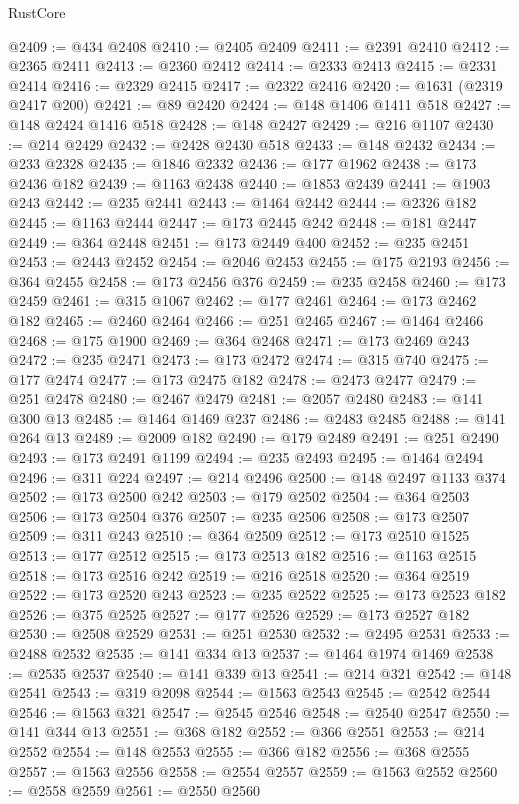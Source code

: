 \begin{lexlean}{RustCore}
\begin{coremodule}
@2409 := @434 @2408
@2410 := @2405 @2409
@2411 := @2391 @2410
@2412 := @2365 @2411
@2413 := @2360 @2412
@2414 := @2333 @2413
@2415 := @2331 @2414
@2416 := @2329 @2415
@2417 := @2322 @2416
@2420 := @1631 (@2319 @2417 @200)
@2421 := @89 @2420
@2424 := @148 @1406 @1411 @518
@2427 := @148 @2424 @1416 @518
@2428 := @148 @2427
@2429 := @216 @1107
@2430 := @214 @2429
@2432 := @2428 @2430 @518
@2433 := @148 @2432
@2434 := @233 @2328
@2435 := @1846 @2332
@2436 := @177 @1962
@2438 := @173 @2436 @182
@2439 := @1163 @2438
@2440 := @1853 @2439
@2441 := @1903 @243
@2442 := @235 @2441
@2443 := @1464 @2442
@2444 := @2326 @182
@2445 := @1163 @2444
@2447 := @173 @2445 @242
@2448 := @181 @2447
@2449 := @364 @2448
@2451 := @173 @2449 @400
@2452 := @235 @2451
@2453 := @2443 @2452
@2454 := @2046 @2453
@2455 := @175 @2193
@2456 := @364 @2455
@2458 := @173 @2456 @376
@2459 := @235 @2458
@2460 := @173 @2459
@2461 := @315 @1067
@2462 := @177 @2461
@2464 := @173 @2462 @182
@2465 := @2460 @2464
@2466 := @251 @2465
@2467 := @1464 @2466
@2468 := @175 @1900
@2469 := @364 @2468
@2471 := @173 @2469 @243
@2472 := @235 @2471
@2473 := @173 @2472
@2474 := @315 @740
@2475 := @177 @2474
@2477 := @173 @2475 @182
@2478 := @2473 @2477
@2479 := @251 @2478
@2480 := @2467 @2479
@2481 := @2057 @2480
@2483 := @141 @300 @13
@2485 := @1464 @1469 @237
@2486 := @2483 @2485
@2488 := @141 @264 @13
@2489 := @2009 @182
@2490 := @179 @2489
@2491 := @251 @2490
@2493 := @173 @2491 @1199
@2494 := @235 @2493
@2495 := @1464 @2494
@2496 := @311 @224
@2497 := @214 @2496
@2500 := @148 @2497 @1133 @374
@2502 := @173 @2500 @242
@2503 := @179 @2502
@2504 := @364 @2503
@2506 := @173 @2504 @376
@2507 := @235 @2506
@2508 := @173 @2507
@2509 := @311 @243
@2510 := @364 @2509
@2512 := @173 @2510 @1525
@2513 := @177 @2512
@2515 := @173 @2513 @182
@2516 := @1163 @2515
@2518 := @173 @2516 @242
@2519 := @216 @2518
@2520 := @364 @2519
@2522 := @173 @2520 @243
@2523 := @235 @2522
@2525 := @173 @2523 @182
@2526 := @375 @2525
@2527 := @177 @2526
@2529 := @173 @2527 @182
@2530 := @2508 @2529
@2531 := @251 @2530
@2532 := @2495 @2531
@2533 := @2488 @2532
@2535 := @141 @334 @13
@2537 := @1464 @1974 @1469
@2538 := @2535 @2537
@2540 := @141 @339 @13
@2541 := @214 @321
@2542 := @148 @2541
@2543 := @319 @2098
@2544 := @1563 @2543
@2545 := @2542 @2544
@2546 := @1563 @321
@2547 := @2545 @2546
@2548 := @2540 @2547
@2550 := @141 @344 @13
@2551 := @368 @182
@2552 := @366 @2551
@2553 := @214 @2552
@2554 := @148 @2553
@2555 := @366 @182
@2556 := @368 @2555
@2557 := @1563 @2556
@2558 := @2554 @2557
@2559 := @1563 @2552
@2560 := @2558 @2559
@2561 := @2550 @2560

\end{coremodule}
\end{lexlean}

